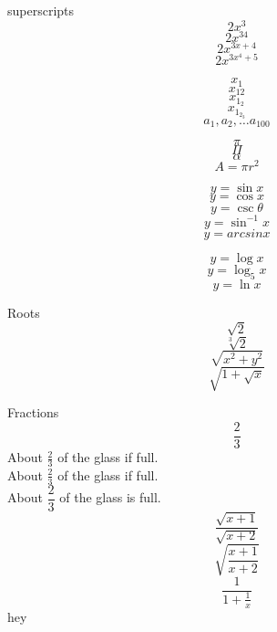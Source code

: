 \documentclass[11pt]{article}
\begin{document}
superscripts $$2x^3$$
$$2x^{34}$$
$$2x^{3x + 4}$$
$$2x^{3x^4+5}$$


$$x_1$$
$$x_{12}$$
$$x_{1_2}$$
$$x_{1_{2_3}}$$
$$a_1, a_2, \ldots a_{100}$$

$$\pi$$ %
$$\Pi$$ %
$$\alpha$$
$$A = \pi r^2$$

$$y = \sin x$$
$$y = \cos x$$
$$ y = \csc \theta$$
$$ y = \sin ^{-1}x$$
$$y = arcsin x$$

$$y = \log x$$
$$y = \log_5 x$$
$$y = \ln x$$

Roots
$$\sqrt{2}$$
$$\sqrt[3]{2}$$
$$\sqrt{x^2+y^2}$$
$$\sqrt{1+\sqrt{x}}$$

Fractions
$$\frac{2}{3}$$
About $\frac{2}{3}$ of the glass if full.\\[16pt]
About $\displaystyle \frac{2}{3}$ of the glass if full. \\[16pt]%
About $\dfrac{2}{3}$ of the glass is full.\\[6pt]

$$\frac{\sqrt{x+1}}{\sqrt{x+2}}$$
$$\sqrt{\frac{x+1}{x+2}}$$
$$\frac{1}{1+\frac{1}{x}}$$
hey
\end{document}
